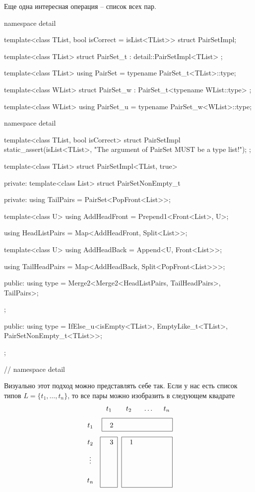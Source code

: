 Еще одна интересная операция -- список всех пар.
\begin{cppcode}
namespace detail {

template<class TList, bool isCorrect = isList<TList>>
struct PairSetImpl;
}

template<class TList>
struct PairSet_t : detail::PairSetImpl<TList> {};

template<class TList>
using PairSet = typename PairSet_t<TList>::type;

template<class WList>
struct PairSet_w : PairSet_t<typename WList::type> {};

template<class WList>
using PairSet_u = typename PairSet_w<WList>::type;

namespace detail {

template<class TList, bool isCorrect>
struct PairSetImpl {
  static_assert(isList<TList>, "The argument of PairSet MUST be a type list!");
};

template<class TList>
struct PairSetImpl<TList, true> {
private:
  template<class List>
  struct PairSetNonEmpty_t {
  private:
    using TailPairs = PairSet<PopFront<List>>;

    template<class U>
    using AddHeadFront = Prepend1<Front<List>, U>;

    using HeadListPairs = Map<AddHeadFront, Split<List>>;

    template<class U>
    using AddHeadBack = Append<U, Front<List>>;

    using TailHeadPairs = Map<AddHeadBack, Split<PopFront<List>>>;

  public:
    using type = Merge2<Merge2<HeadListPairs, TailHeadPairs>, TailPairs>;
  };

public:
  using type =
      IfElse_u<isEmpty<TList>, EmptyLike_t<TList>, PairSetNonEmpty_t<TList>>;
};
} // namespace detail
\end{cppcode}
Визуально этот подход можно представлять себе так.
Если у нас есть список типов $L = \{t_1,\ldots, t_n\}$, то все пары можно изобразить в следующем квадрате
\[
\xymatrix@R=10pt@C=10pt{
  {}&{t_1}&{t_2}&{\ldots}&{t_n}\\
  {t_1}&{\phantom{A}2}{\save
   [].[rrr]*+[F-]\frm{}
  \restore}&{}&{}&{}\\
  {t_2}&{\phantom{A}3}{\save
   [].[dd]*+[F-]\frm{}
  \restore}&{\phantom{A}1}{\save
   [].[rrdd]*+[F-]\frm{}
  \restore}&{}&{}\\
  {\vdots}&{}&{}&{}&{}\\
  {t_n}&{}&{}&{}&{}\\
}
\]
